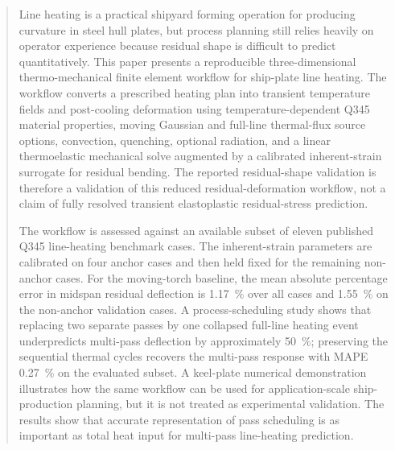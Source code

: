 \begin{abstract}
Line heating is a practical shipyard forming operation for producing curvature in steel hull plates, but process planning still relies heavily on operator experience because residual shape is difficult to predict quantitatively. This paper presents a reproducible three-dimensional thermo-mechanical finite element workflow for ship-plate line heating. The workflow converts a prescribed heating plan into transient temperature fields and post-cooling deformation using temperature-dependent Q345 material properties, moving Gaussian and full-line thermal-flux source options, convection, quenching, optional radiation, and a linear thermoelastic mechanical solve augmented by a calibrated inherent-strain surrogate for residual bending. The reported residual-shape validation is therefore a validation of this reduced residual-deformation workflow, not a claim of fully resolved transient elastoplastic residual-stress prediction.

The workflow is assessed against an available subset of eleven published Q345 line-heating benchmark cases. The inherent-strain parameters are calibrated on four anchor cases and then held fixed for the remaining non-anchor cases. For the moving-torch baseline, the mean absolute percentage error in midspan residual deflection is \SI{1.17}{\%} over all cases and \SI{1.55}{\%} on the non-anchor validation cases. A process-scheduling study shows that replacing two separate passes by one collapsed full-line heating event underpredicts multi-pass deflection by approximately \SI{50}{\%}; preserving the sequential thermal cycles recovers the multi-pass response with MAPE \SI{0.27}{\%} on the evaluated subset. A keel-plate numerical demonstration illustrates how the same workflow can be used for application-scale ship-production planning, but it is not treated as experimental validation. The results show that accurate representation of pass scheduling is as important as total heat input for multi-pass line-heating prediction.
\end{abstract}
